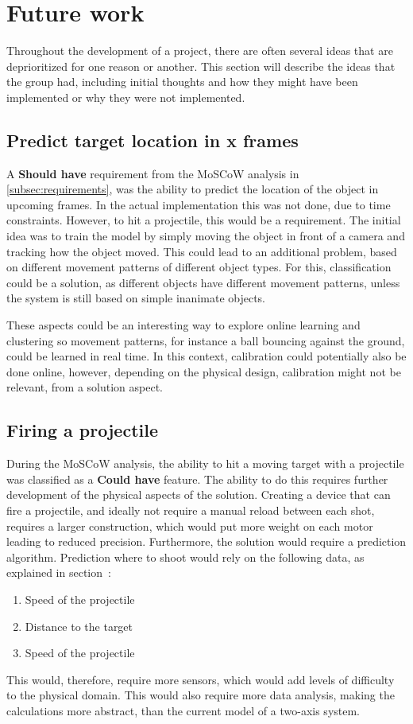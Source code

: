 \section{Future work}\label{sec:futurework}
Throughout the development of a project, there are often several ideas that are deprioritized for one reason or another.
This section will describe the ideas that the group had, including initial thoughts and how they might have been implemented or why they were not implemented.


\subsection{Predict target location in x frames}
A \textbf{Should have} requirement from the MoSCoW analysis in \autoref{subsec:requirements}, was the ability to predict the location of the object in upcoming frames.
In the actual implementation this was not done, due to time constraints.
However, to hit a projectile, this would be a requirement.
The initial idea was to train the model by simply moving the object in front of a camera and tracking how the object moved.
This could lead to an additional problem, based on different movement patterns of different object types.
For this, classification could be a solution, as different objects have different movement patterns, unless the system is still based on simple inanimate objects.

These aspects could be an interesting way to explore online learning and clustering so movement patterns, for instance a ball bouncing against the ground, could be learned in real time. 
In this context, calibration could potentially also be done online, however, depending on the physical design, calibration might not be relevant, from a solution aspect.



\subsection{Firing a projectile}
During the MoSCoW analysis, the ability to hit a moving target with a projectile was classified as a \textbf{Could have} feature.
The ability to do this requires further development of the physical aspects of the solution.
Creating a device that can fire a projectile, and ideally not require a manual reload between each shot, requires a larger construction, which would put more weight on each motor leading to reduced precision.
Furthermore, the solution would require a prediction algorithm.
Prediction where to shoot would rely on the following data, as explained in section~:
\begin{enumerate}
	\item Speed of the projectile
	\item Distance to the target
	\item Speed of the projectile
\end{enumerate}
This would, therefore, require more sensors, which would add levels of difficulty to the physical domain.
This would also require more data analysis, making the calculations more abstract, than the current model of a two-axis system.


